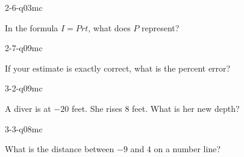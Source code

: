 \begin{practiceQuestion}{2-6-q03}{mc}
\begin{questionText}
In the formula $I = Prt$, what does $P$ represent?
\end{questionText}
\end{practiceQuestion}

\begin{practiceQuestion}{2-7-q09}{mc}
\begin{questionText}
If your estimate is exactly correct, what is the percent error?
\end{questionText}
\end{practiceQuestion}

\begin{practiceQuestion}{3-2-q09}{mc}
\begin{questionText}
A diver is at $-20$ feet. She rises $8$ feet. What is her new depth?
\end{questionText}
\end{practiceQuestion}

\begin{practiceQuestion}{3-3-q08}{mc}
\begin{questionText}
What is the distance between $-9$ and $4$ on a number line?
\end{questionText}
\end{practiceQuestion}

